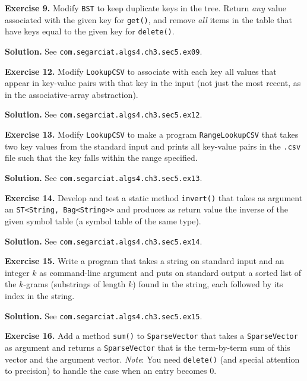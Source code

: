 \documentclass[12pt, a4paper]{article}
\newenvironment{ex}[2][Exercise]
{\par\medskip\noindent \textbf{#1 #2.}}
{\medskip}
\newenvironment{sol}[1][Solution]
{\par\medskip\noindent \textbf{#1.} }
{\medskip}
\begin{document}
	\begin{ex}{9}
		Modify \texttt{BST} to keep duplicate keys in the tree. Return \emph{any} value associated
		with the given key for \texttt{get()}, and remove \emph{all} items in the table that have
		keys equal to the given key for \texttt{delete()}.
	\end{ex}
	\begin{sol}
		See \texttt{com.segarciat.algs4.ch3.sec5.ex09}.
	\end{sol}
	\begin{ex}{12}
		Modify \texttt{LookupCSV} to associate with each key all values that appear
		in key-value pairs with that key in the input (not just the most recent,
		as in the associative-array abstraction).
	\end{ex}
	\begin{sol}
		See \texttt{com.segarciat.algs4.ch3.sec5.ex12}.
	\end{sol}
	\begin{ex}{13}
		Modify \texttt{LookupCSV} to make a program \texttt{RangeLookupCSV} that takes two key
		values from the standard input and prints all key-value pairs in the \texttt{.csv}
		file such that the key falls within the range specified.
	\end{ex}
	\begin{sol}
		See \texttt{com.segarciat.algs4.ch3.sec5.ex13}.
	\end{sol}
	\begin{ex}{14}
		Develop and test a static method \texttt{invert()} that takes as argument an
		\texttt{ST<String, Bag<String>>} and produces as return value the inverse
		of the given symbol table (a symbol table of the same type).
	\end{ex}
	\begin{sol}
		See \texttt{com.segarciat.algs4.ch3.sec5.ex14}.
	\end{sol}
	\begin{ex}{15}
		Write a program that takes a string on standard input and an integer $k$
		as command-line argument and puts on standard output a sorted list of the
		$k$-grams (substrings of length $k$) found in the string, each followed by
		its index in the string.
	\end{ex}
	\begin{sol}
		See \texttt{com.segarciat.algs4.ch3.sec5.ex15}.
	\end{sol}
	\begin{ex}{16}
		Add a method \texttt{sum()} to \texttt{SparseVector} that takes a \texttt{SparseVector}
		as argument and returns a \texttt{SparseVector} that is the term-by-term sum of this
		vector and the argument vector. \emph{Note}: You need \texttt{delete()} (and special
		attention to precision) to handle the case when an entry becomes 0.
	\end{ex}
\end{document}

